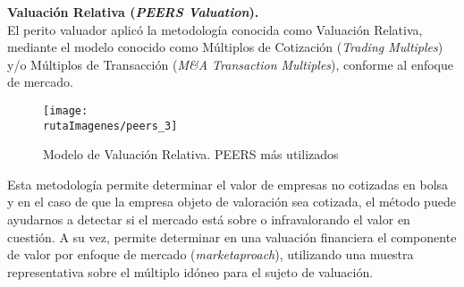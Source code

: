\textcolor{secundario}{\textbf{Valuaci\'on Relativa (\textit{PEERS Valuation}).}}\\[5pt]

El perito valuador aplic\'o la metodolog\'ia conocida como Valuaci\'on Relativa, mediante el modelo conocido como Múltiplos de Cotización (\textit{Trading Multiples}) y/o Múltiplos de Transacción (\textit{M\&A Transaction Multiples}), conforme al enfoque de mercado.\\




%
%

\begin{figure}[H]
\centering
\caption{Modelo de Valuaci\'on Relativa. PEERS m\'as utilizados\label{fig:peers1}}\vspace{10pt}
\texttt{[image: \\rutaImagenes/peers\_3]}
\end{figure}


 Esta metodolog\'ia permite determinar el valor de empresas no cotizadas en bolsa y en el caso de que la empresa objeto de valoraci\'on sea cotizada, el m\'etodo puede ayudarnos a detectar si el mercado  est\'a sobre o infravalorando el valor en cuesti\'on.  A su vez, permite determinar en una valuaci\'on financiera el componente de valor por enfoque de mercado (\textit{\gls{marketaproach}}), utilizando una muestra representativa sobre el m\'ultiplo  id\'oneo para el sujeto de valuaci\'on. \\
 